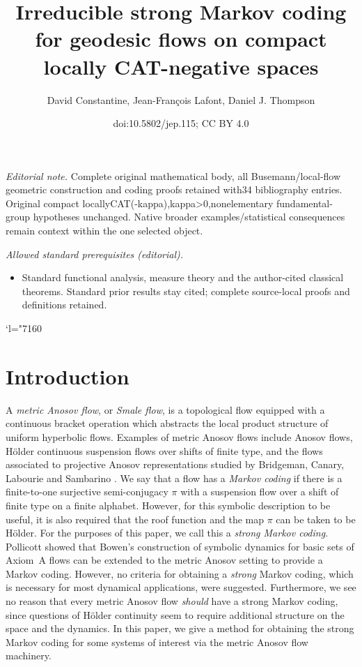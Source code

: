 \documentclass[10pt]{amsart}
\title{Irreducible strong Markov coding for geodesic flows on compact locally CAT-negative spaces}
\author{David Constantine, Jean-François Lafont, Daniel J. Thompson}
\date{doi:10.5802/jep.115; CC BY 4.0}
\newcommand{\Changel}{\mathcode`l="7160}
\theoremstyle{definition}
\numberwithin{equation}{section}
\begin{document}
\maketitle
\noindent\textit{Editorial note.} Complete original mathematical body, all Busemann/local-flow geometric construction and coding proofs retained with34 bibliography entries. Original compact locallyCAT(-kappa),kappa>0,nonelementary fundamental-group hypotheses unchanged. Native broader examples/statistical consequences remain context within the one selected object.\par\medskip
\noindent\textit{Allowed standard prerequisites (editorial).}\begin{itemize}
\item Standard functional analysis, measure theory and the author-cited classical theorems. Standard prior results stay cited; complete source-local proofs and definitions retained.
\end{itemize}\medskip
\newpage
\tableofcontents


\vspace*{-\baselineskip}\vskip0pt
\Changel
\section{Introduction}

A \emph{metric Anosov flow}, or \emph{Smale flow}, is a topological flow equipped with a continuous bracket operation which abstracts the local product structure of uniform hyperbolic flows. Examples of metric Anosov flows include Anosov flows, Hölder continuous suspension flows over shifts of finite type, and the flows associated to projective Anosov representations studied by Bridgeman, Canary, Labourie and Sambarino \cite{bcls, BC17}. We say that a flow has a \emph{Markov coding} if there is a finite-to-one surjective semi-conjugacy $\pi$ with a suspension flow over a shift of finite type on a finite alphabet. However, for this symbolic description to be useful, it is also required that the roof function and the map $\pi$ can be taken to be Hölder. For the purposes of this paper, we call this a \emph{strong Markov coding}. Pollicott showed that Bowen's construction of symbolic dynamics for basic sets of Axiom~A flows can be extended to the metric Anosov setting \cite{pollicott} to provide a Markov coding. However, no criteria for obtaining a \emph{strong} Markov coding, which is necessary for most dynamical applications, were suggested. Furthermore, we see no reason that every metric Anosov flow \emph{should} have a strong Markov coding, since questions of Hölder continuity seem to require additional structure on the space and the dynamics. In this paper, we give a method for obtaining the strong Markov coding for some systems of interest via the metric Anosov flow machinery.
\end{document}
